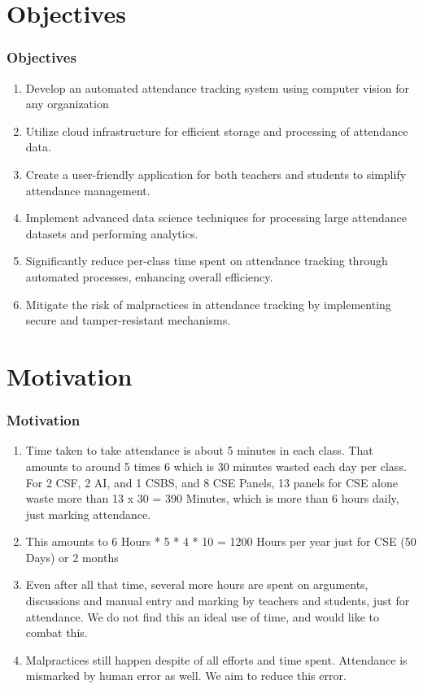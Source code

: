 \documentclass[aspectratio=169]{beamer}
\begin{document}
\section{Objectives}
\begin{frame}
  \frametitle{Objectives}
\begin{enumerate}
  \item Develop an automated attendance tracking system using computer vision for any organization
  \item Utilize cloud infrastructure for efficient storage and processing of attendance data.
  \item Create a user-friendly application for both teachers and students to simplify attendance management.
  \item Implement advanced data science techniques for processing large attendance datasets and performing analytics.
  \item Significantly reduce per-class time spent on attendance tracking through automated processes, enhancing overall efficiency.
  \item Mitigate the risk of malpractices in attendance tracking by implementing secure and tamper-resistant mechanisms.
  
\end{enumerate}
\end{frame}


\section{Motivation}
\begin{frame}
  \frametitle{Motivation}
  \begin{enumerate}
    \item Time taken to take attendance is about 5 minutes in each class. That amounts to around 5 times 6 which is 30 minutes wasted each day per class. For 2 CSF, 2 AI, and 1 CSBS, and 8 CSE Panels, 13 panels for CSE alone waste more than 13 x 30 = 390 Minutes, which is more than 6 hours daily, just marking attendance.
    \item This amounts to 6 Hours * 5 * 4 * 10 = 1200 Hours per year just for CSE (50 Days) or 2 months
    \item Even after all that time, several more hours are spent on arguments, discussions and manual entry and marking by teachers and students, just for attendance. We do not find this an ideal use of time, and would like to combat this. 
    \item Malpractices still happen despite of all efforts and time spent. Attendance is mismarked by human error as well. We aim to reduce this error. 
  \end{enumerate}
\end{frame}
\end{document}

